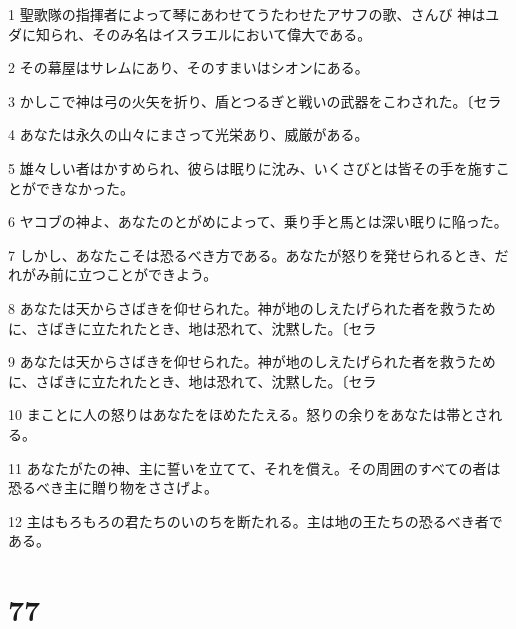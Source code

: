 \par 1 聖歌隊の指揮者によって琴にあわせてうたわせたアサフの歌、さんび 神はユダに知られ、そのみ名はイスラエルにおいて偉大である。
\par 2 その幕屋はサレムにあり、そのすまいはシオンにある。
\par 3 かしこで神は弓の火矢を折り、盾とつるぎと戦いの武器をこわされた。〔セラ
\par 4 あなたは永久の山々にまさって光栄あり、威厳がある。
\par 5 雄々しい者はかすめられ、彼らは眠りに沈み、いくさびとは皆その手を施すことができなかった。
\par 6 ヤコブの神よ、あなたのとがめによって、乗り手と馬とは深い眠りに陥った。
\par 7 しかし、あなたこそは恐るべき方である。あなたが怒りを発せられるとき、だれがみ前に立つことができよう。
\par 8 あなたは天からさばきを仰せられた。神が地のしえたげられた者を救うために、さばきに立たれたとき、地は恐れて、沈黙した。〔セラ
\par 9 あなたは天からさばきを仰せられた。神が地のしえたげられた者を救うために、さばきに立たれたとき、地は恐れて、沈黙した。〔セラ
\par 10 まことに人の怒りはあなたをほめたたえる。怒りの余りをあなたは帯とされる。
\par 11 あなたがたの神、主に誓いを立てて、それを償え。その周囲のすべての者は恐るべき主に贈り物をささげよ。
\par 12 主はもろもろの君たちのいのちを断たれる。主は地の王たちの恐るべき者である。

\chapter{77}


